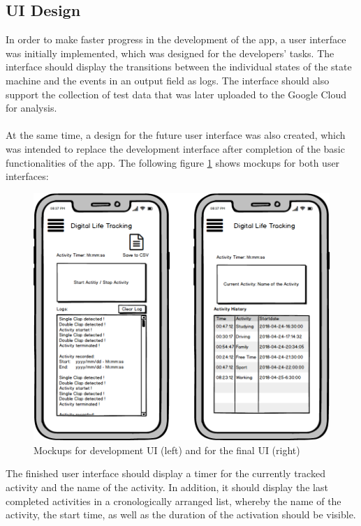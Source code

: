 \subsection{UI Design}
\label{sec:orgc19d2ea}
In order to make faster progress in the development of the app, a user interface was initially implemented, which was designed for the developers' tasks. The interface should display the transitions between the individual states of the state machine and the events in an output field as logs. The interface should also support the collection of test data that was later uploaded to the Google Cloud for analysis. 
\\\\
At the same time, a design for the future user interface was also created, which was intended to replace the development interface after completion of the basic functionalities of the app. The following figure \ref{mockups} shows mockups for both user interfaces:
\begin{figure}[H]
	\centering
	\includegraphics[width=1.0\linewidth]{./imgs/mock.png}
	\caption[Caption for LOF]{Mockups for development UI (left) and for the final UI (right)}
	\label{mockups}
\end{figure}
The finished user interface should display a timer for the currently tracked activity and the name of the activity. In addition, it should display the last completed activities in a cronologically arranged list, whereby the name of the activity, the start time, as well as the duration of the activation should be visible.
